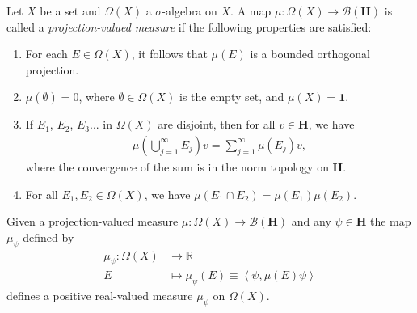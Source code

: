 \begin{definition}
    \label{def:projection-valued-measure} %
    Let $X$ be a set and $\Omega(X)$ a $\sigma$-algebra on $X$. A map $\mu : \Omega(X) \rightarrow \mathcal{B}(\mathbf{H})$ is called a \textit{projection-valued measure} if the following properties are satisfied:
    \begin{enumerate}
        \item For each $E \in \Omega(X)$, it follows that $\mu(E)$ is a bounded orthogonal projection.
        \item $\mu(\emptyset) = 0$, where $\emptyset \in \Omega(X)$ is the empty set, and $\mu(X) = \mathbf{1}$. 
        \item If $E_1$, $E_2$, $E_3$... in $\Omega(X)$ are disjoint, then for all $v \in \mathbf{H}$, we have
            \begin{align}
                \mu \left( \bigcup_{j = 1}^{\infty} E_j \right) v = \sum_{j = 1}^{\infty} \mu(E_j)v,
            \end{align}
            where the convergence of the sum is in the norm topology on $\mathbf{H}$.
        \item For all $E_1, E_2 \in \Omega(X)$, we have $\mu(E_1 \cap E_2) = \mu(E_1) \mu(E_2)$.
    \end{enumerate}
\end{definition}

\begin{theorem}
    \label{thrm:projection-valued-measures-associated-measure} %
    Given a projection-valued measure $\mu : \Omega(X) \rightarrow \mathcal{B}(\mathbf{H})$ and any $\psi \in \mathbf{H}$ the map $\mu_\psi$ defined by
    \begin{align}
        \mu_\psi : \Omega(X) &\longrightarrow \mathbb{R} \\
                          E  &\longmapsto \mu_\psi(E) \equiv \left< \psi, \mu(E) \psi \right>
    \end{align}
    defines a positive real-valued measure $\mu_\psi$ on $\Omega(X)$.
\end{theorem}

